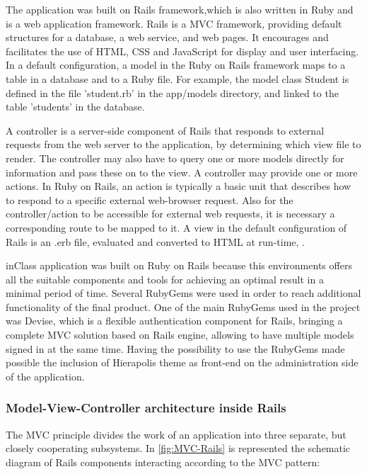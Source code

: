 The application was built on Rails framework,which is also written in Ruby and is a web application framework. Rails is a MVC framework, providing default structures for a database, a web service, and web pages. It encourages and facilitates the use of HTML, CSS and JavaScript for display and user interfacing. In a default configuration, a model in the Ruby on Rails framework maps to a table in a database and to a Ruby file. For example, the model class Student is defined in the file 'student.rb' in the app/models directory, and linked to the table 'students' in the database. 

A controller is a server-side component of Rails that responds to external requests from the web server to the application, by determining which view file to render. The controller may also have to query one or more models directly for information and pass these on to the view. A controller may provide one or more actions. In Ruby on Rails, an action is typically a basic unit that describes how to respond to a specific external web-browser request. Also for the controller/action to be accessible for external web requests, it is necessary a corresponding route to be mapped to it. A view in the default configuration of Rails is an .erb file, evaluated and converted to HTML at run-time, \cite{RoR2}.

inClass application was built on Ruby on Rails because this environments offers all the suitable components and tools for achieving an optimal result in a minimal period of time. Several RubyGems were used in order to reach additional functionality of the final product. One of the main RubyGems used in the project was Devise, which is a flexible authentication component for Rails, bringing a complete MVC solution based on Rails engine, allowing to have multiple models signed in at the same time. Having the possibility to use the RubyGems made possible the inclusion of Hierapolis theme as front-end on the administration side of the application. 

\subsubsection{Model-View-Controller architecture inside Rails}
The MVC principle divides the work of an application into three separate, but closely cooperating subsystems. In \autoref{fig:MVC-Rails} is represented the schematic diagram of Rails components interacting according to the MVC pattern:

